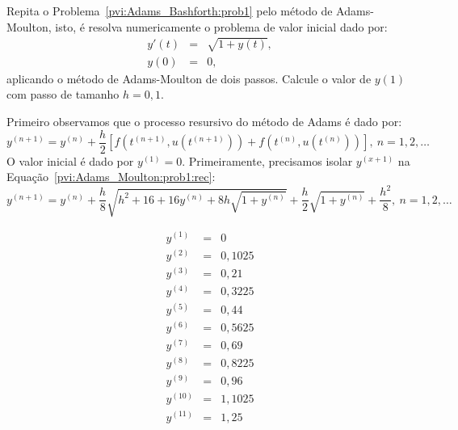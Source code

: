 \begin{exeresol}\label{pvi:Adams_Moulton:prob1} Repita o Problema~\ref{pvi:Adams_Bashforth:prob1} pelo método de Adams-Moulton, isto, é  resolva numericamente o problema de valor inicial dado por:
\begin{eqnarray*}
 y'(t)&=& \sqrt{1+y(t)},\\
 y(0)&=& 0,
\end{eqnarray*}
aplicando o método de Adams-Moulton de dois passos. Calcule o valor de $y(1)$ com passo de tamanho $h=0,1$.
\end{exeresol}
\begin{resol} 
Primeiro observamos que o processo resursivo do método de Adams é dado por: 
\begin{equation}\label{pvi:Adams_Moulton:prob1:rec}
  y^{(n+1)}=y^{(n)}+\frac{h}{2}\left[f\left(t^{(n+1)},u(t^{(n+1)})\right)+f\left(t^{(n)},u(t^{(n)})\right)\right],~n=1,2,\ldots
 \end{equation}
O valor inicial é dado por $y^{(1)}=0$. Primeiramente, precisamos isolar $y^{(x+1)}$ na Equação~\ref{pvi:Adams_Moulton:prob1:rec}:
\begin{equation*}
  y^{(n+1)}=y^{(n)}+\frac{h}{8} \sqrt {{h}^{2}+16+16y^{(n)}+8h\sqrt {1+y^{(n)}}} +\frac{h}{2}\sqrt {1+y^{(n)}}+\frac{h^2}{8},~n=1,2,\ldots
 \end{equation*}

  \begin{eqnarray*}
 y^{(1)}&=&0\\
 y^{(2)}&=&0,1025\\
y^{(3)}&=&0,21\\
y^{(4)}&=&0,3225\\
y^{(5)}&=&0,44\\
y^{(6)}&=&0,5625\\
y^{(7)}&=&0,69\\
y^{(8)}&=&0,8225\\
y^{(9)}&=&0,96\\
y^{(10)}&=&1,1025\\
y^{(11)}&=&1,25
\end{eqnarray*}

\end{resol}



